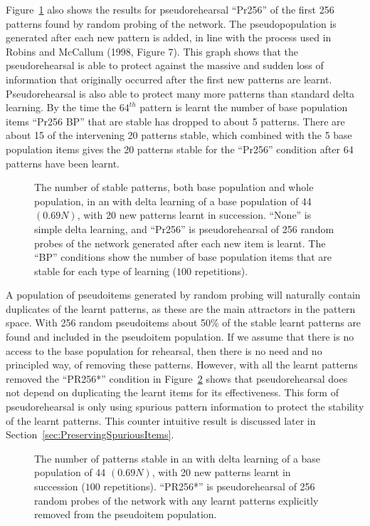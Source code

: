 Figure~\ref{fig:PR1998None256} also shows the results for pseudorehearsal ``Pr256'' of the first 256 patterns found by random probing of the network.  The pseudopopulation is generated after each new pattern is added, in line with the process used in Robins and McCallum (1998, Figure 7).  This graph shows that the pseudorehearsal is able to protect against the massive and sudden loss of information that originally occurred after the first new patterns are learnt.  Pseudorehearsal is also able to protect many more patterns than standard delta learning.  By the time the $64^{th}$ pattern is learnt the number of base population items ``Pr256 BP'' that are stable has dropped to about 5 patterns.  There are about 15 of the intervening 20 patterns stable, which combined with the 5 base population items gives the 20 patterns stable for the ``Pr256'' condition after 64 patterns have been learnt.

\begin{figure}[tbp]
\small
	\centering
		 
	\caption{The number of stable patterns, both base population and whole population, in an  with delta learning of a base population of 44 $(0.69N)$, with 20 new patterns learnt in succession. ``None'' is simple delta learning, and ``Pr256'' is pseudorehearsal of 256 random probes of the network generated after each new item is learnt. The ``BP'' conditions show the number of base population items that are stable for each type of learning ($100$ repetitions).}
	\label{fig:PR1998None256}
\end{figure}

A population of pseudoitems generated by random probing will naturally contain duplicates of the learnt patterns, as these are the main attractors in the pattern space. With 256 random pseudoitems about 50\% of the stable learnt patterns are found and included in the pseudoitem population. If we assume that there is no access to the base population for rehearsal, then there is no need and no principled way, of removing these patterns. However, with all the learnt patterns removed the ``PR256*'' condition in Figure~\ref{fig:Robins98PR256_Star} shows that pseudorehearsal does not depend on duplicating the learnt items for its effectiveness.  This form of pseudorehearsal is only using spurious pattern information to protect the stability of the learnt patterns.  This counter intuitive result is discussed later in Section~\ref{sec:PreservingSpuriousItems}.

\begin{figure}[tbp]
\small
	\centering
		 
	\caption{The number of patterns stable in an  with delta learning of a base population of 44 $(0.69N)$, with 20 new patterns learnt in succession ($100$ repetitions). ``PR256*'' is pseudorehearsal of 256 random probes of the network with any learnt patterns explicitly removed from the pseudoitem population.}
	\label{fig:Robins98PR256_Star}
\end{figure}

